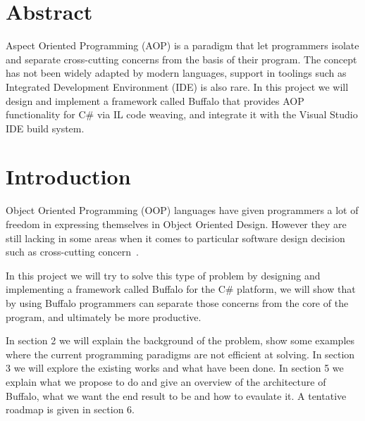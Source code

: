 \newcommand{\etc} {\emph{etc.\/}}
\newcommand{\etal}{\emph{et~al.\/}}
\newcommand{\eg}  {\emph{e.g.\/}}
\newcommand{\ie}  {\emph{i.e.\/}}


\section*{Abstract}
Aspect Oriented Programming (AOP) is a paradigm that let programmers isolate and separate cross-cutting concerns from the basis of their program. The concept has not been widely adapted by modern languages, support in toolings such as Integrated Development Environment (IDE) is also rare. In this project we will design and implement a framework called Buffalo that provides AOP functionality for C\# via IL code weaving, and integrate it with the Visual Studio IDE build system.
\vfill{}

\setcounter{page}{0} 
\newpage{}
\section{Introduction}
Object Oriented Programming (OOP) languages have given programmers a lot of freedom in expressing themselves in Object Oriented Design. However they are still lacking in some areas when it comes to particular software design decision such as cross-cutting concern~\cite{aop}. 

In this project we will try to solve this type of problem by designing and implementing a framework called Buffalo for the C\# platform, we will show that by using Buffalo programmers can separate those concerns from the core of the program, and ultimately be more productive.

In section 2 we will explain the background of the problem, show some examples where the current programming paradigms are not efficient at solving. In section 3 we will explore the existing works and what have been done. In section 5 we explain what we propose to do and give an overview of the architecture of Buffalo, what we want the end result to be and how to evaulate it. A tentative roadmap is given in section 6.

